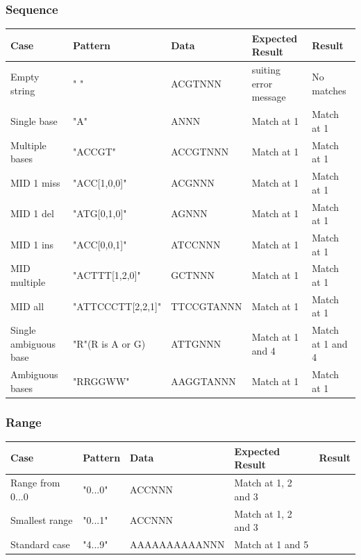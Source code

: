 \documentclass[12pt]{article}
\begin{document}
\subsubsection{Sequence}
\begin{table}[h]
\begin{tabular}{l|l|l|l|l}
Case 			& Pattern & Data & Expected Result & Result \\ \hline
Empty string		& " " & ACGTNNN & suiting error message & No matches \\ \hline
Single base 		& "A" & ANNN & Match at 1 & Match at 1\\ \hline
Multiple bases	& "ACCGT" & ACCGTNNN & Match at 1 & Match at 1 \\ \hline
MID 1 miss		& "ACC[1,0,0]" & ACGNNN & Match at 1 & Match at 1\\ \hline
MID 1 del		& "ATG[0,1,0]" & AGNNN & Match at 1 & Match at 1 \\ \hline
MID 1 ins		& "ACC[0,0,1]" & ATCCNNN & Match at 1 & Match at 1\\ \hline
MID multiple		& "ACTTT[1,2,0]" & GCTNNN & Match at 1 & Match at 1\\ \hline
MID all			& "ATTCCCTT[2,2,1]" & TTCCGTANNN & Match at 1 & Match at 1\\ \hline
Single ambiguous base & "R"(R is A or G) & ATTGNNN & Match at 1 and 4 & Match at 1 and 4 \\ \hline
Ambiguous bases	& "RRGGWW" & AAGGTANNN & Match at 1 & Match at 1
\end{tabular}
\end{table}

\subsubsection{Range}
\begin{table}[h]
\begin{tabular}{p{4cm}|l|l|p{3cm}|l}
Case 			& Pattern & Data & Expected Result & Result \\ \hline
Range from 0...0	& "0...0" & ACCNNN & Match at 1, 2 and 3 & \\ \hline
Smallest range 	& "0...1" & ACCNNN & Match at 1, 2 and 3 & \\ \hline
Standard case	& "4...9" & AAAAAAAAAANNN & Match at 1 and 5 &
\end{tabular}
\end{table}
\end{document}
